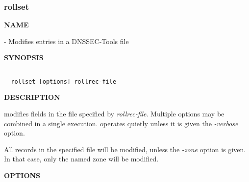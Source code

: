 \clearpage

\subsubsection{rollset}

{\bf NAME}

 - Modifies entries in a DNSSEC-Tools  file

{\bf SYNOPSIS}

\begin{verbatim}

  rollset [options] rollrec-file

\end{verbatim}

{\bf DESCRIPTION}

 modifies fields in the  file specified
by {\it rollrec-file}.  Multiple options may be combined in a single
 execution.   operates quietly unless it is
given the {\it -verbose} option.

All records in the specified  file will be modified, unless
the {\it -zone} option is given.  In that case, only the named zone will be
modified.

{\bf OPTIONS}

